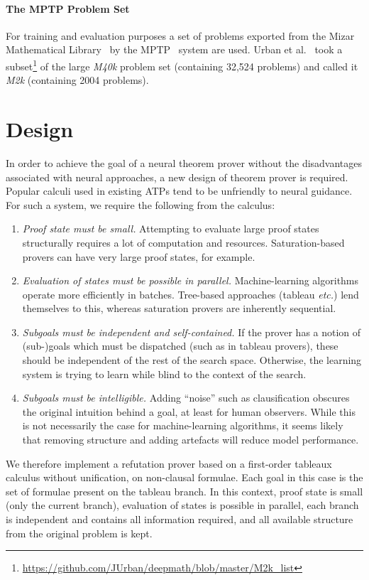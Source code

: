\documentclass{llncs}
\newcommand{\mizarlarge}{\textit{M40k}}
\newcommand{\mizarsmall}{\textit{M2k}}
\begin{document}
\paragraph{The MPTP Problem Set}
For training and evaluation purposes a set of problems exported from the Mizar Mathematical Library~\cite{mizar} by the MPTP~\cite{MPTP} system are used.
Urban et al.~\cite{rlCoP} took a subset\footnote{\url{https://github.com/JUrban/deepmath/blob/master/M2k_list}} of the large \mizarlarge{} problem set (containing 32,524 problems) and called it \mizarsmall{} (containing 2004 problems).

\section{Design}
\label{section:Design}
In order to achieve the goal of a neural theorem prover without the disadvantages associated with neural approaches, a new design of theorem prover is required.
Popular calculi used in existing ATPs tend to be unfriendly to neural guidance.
For such a system, we require the following from the calculus:
\begin{enumerate}
        \item \emph{Proof state must be small.} Attempting to evaluate large proof states structurally requires a lot of computation and resources. Saturation-based provers can have very large proof states, for example.
        \item \emph{Evaluation of states must be possible in parallel.} Machine-learning algorithms operate more efficiently in batches. Tree-based approaches (tableau \emph{etc.}) lend themselves to this, whereas saturation provers are inherently sequential.
        \item \emph{Subgoals must be independent and self-contained.} If the prover has a notion of (sub-)goals which must be dispatched (such as in tableau provers), these should be independent of the rest of the search space.%
        Otherwise, the learning system is trying to learn while blind to the context of the search.
	\item \emph{Subgoals must be intelligible.} Adding ``noise'' such as clausification obscures the original intuition behind a goal, at least for human observers. While this is not necessarily the case for machine-learning algorithms, it seems likely that removing structure and adding artefacts will reduce model performance.
\end{enumerate}
We therefore implement a refutation prover based on a first-order tableaux calculus without unification, on non-clausal formulae.
Each goal in this case is the set of formulae present on the tableau branch.
In this context, proof state is small (only the current branch), evaluation of states is possible in parallel, each branch is independent and contains all information required, and all available structure from the original problem is kept.
\end{document}
